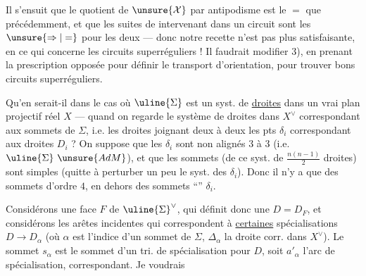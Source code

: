Il s'ensuit que le quotient de
$\unsure{\mathcal X}$ par antipodisme est le $=$ que
précédemment, et que les suites de
 intervenant dans un circuit
sont les  $\unsure{\Rightarrow|=}$ pour les deux --- donc
notre recette n'est pas plus satisfaisante,
en ce qui concerne les circuits
superréguliers ! Il faudrait modifier
3), en prenant la prescription opposée
pour définir le transport d'orientation,
pour trouver  bons circuits
superréguliers.

Qu'en serait-il dans le cas
où $\uline{\Sigma}$ est un syst. de \uline{droites} dans un
vrai plan projectif réel $X$ --- quand on regarde
le système de droites dans $X^\vee$ correspondant
aux sommets de $\Sigma$, i.e. les droites joignant
deux à deux les pts $\delta_i$ correspondant aux
droites $D_i$ ? On suppose  que les $\delta_i$ sont non
alignés $3$ à $3$ (i.e. $\uline{\Sigma}\ \unsure{AdM}$), et que
les sommets  (de ce syst. de
$\frac{n(n-1)}2$ droites) sont simples (quitte
à perturber un peu le syst. des
$\delta_i$). Donc il n'y a que des
sommets d'ordre $4$, en dehors des
sommets ``'' $\delta_i$.

Considérons une face $F$ de $\uline{\Sigma}^\vee$,
qui définit donc une 
$D=D_F$, et considérons les
arêtes incidentes  qui correspondent
à \uline{certaines} spécialisations
$D\to D_\alpha$ (où $\alpha$ est l'indice d'un
sommet de $\Sigma$, $\Delta_\alpha$ la droite
corr. dans $X^\vee$). Le sommet
$s_\alpha$ est le sommet d'un
tri. de spécialisation pour $D$,
soit $a'_\alpha$ l'arc de spécialisation,
correspondant. Je voudrais

